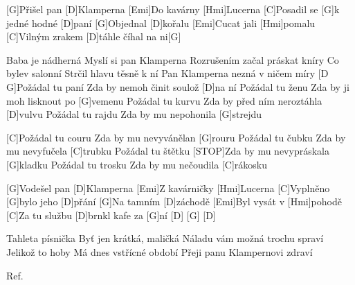 
[G]Přišel pan [D]Klamperna
[Emi]Do kavárny [Hmi]Lucerna
[C]Posadil se [G]k jedné hodné [D]paní
[G]Objednal [D]kořalu
[Emi]Cucat jali [Hmi]pomalu
[C]Vilným zrakem [D]táhle číhal na ni[G]

Baba je nádherná
Myslí si pan Klamperna
Rozrušením začal práskat kníry
Co bylev salonní
Strčil hlavu těsně k ní
Pan Klamperna nezná v ničem míry
[D G]Požádal tu paní
Zda by nemoh činit soulož [D]na ní
Požádal tu ženu
Zda by ji moh lisknout po [G]vemenu
Požádal tu kurvu
Zda by před ním neroztáhla [D]vulvu
Požádal tu rajdu
Zda by mu nepohonila [G]strejdu

[C]Požádal tu couru
Zda by mu nevyvánělan [G]rouru
Požádal tu čubku
Zda by mu nevyfučela [C]trubku
Požádal tu štětku
[STOP]Zda by mu nevypráskala [G]kladku
Požádal tu trosku
Zda by mu nečoudila [C]rákosku

[G]Vodešel pan [D]Klamperna
[Emi]Z kavárničky [Hmi]Lucerna
[C]Vyplněno [G]bylo jeho [D]přání
[G]Na tamním [D]záchodě
[Emi]Byl vysát v [Hmi]pohodě
[C]Za tu službu [D]brnkl kafe za [G]ní
[D] [G] [D]

Tahleta písnička
Byť jen krátká, maličká
Náladu vám možná trochu spraví
Jelikož to hoby
Má dnes vstřícné období
Přeji panu Klampernovi zdraví

Ref.
